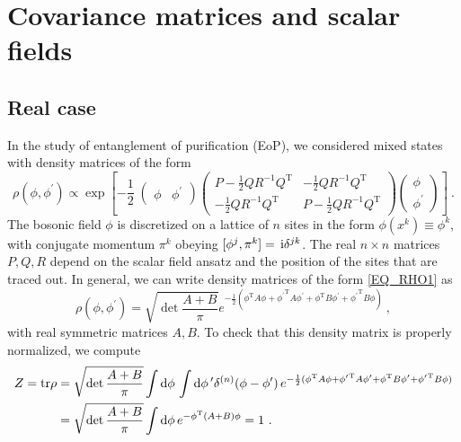 \documentclass[letter]{article}
\newcommand{\intd}[1]{\int\mathrm{d}#1\,}
\begin{document}
\section{Covariance matrices and scalar fields}
\subsection{Real case}

In the study of entanglement of purification (EoP), we considered mixed states with density matrices of the form
\begin{equation}
\label{EQ_RHO1}
\rho(\phi, \phi^\prime) \propto \exp\left[ 
-\frac{1}{2}\;
\begin{pmatrix}
\phi &
\phi^\prime
\end{pmatrix}
\begin{pmatrix}
P - \frac{1}{2}Q R^{-1} Q^\mathrm{T} & - \frac{1}{2}Q R^{-1} Q^\mathrm{T}\\
- \frac{1}{2}Q R^{-1} Q^\mathrm{T} & P - \frac{1}{2}Q R^{-1} Q^\mathrm{T}
\end{pmatrix}
\begin{pmatrix}
\phi \\
\phi^\prime
\end{pmatrix}
 \right]\ .
\end{equation}
The bosonic field $\phi$ is discretized on a lattice of $n$ sites in the form $\phi(x^k) \equiv \phi^k$, with conjugate momentum $\pi^k$ obeying $[\phi^j,\pi^k] = \,\mathrm{i}\delta^{j k}$. The real $n\times n$ matrices $P,Q,R$ depend on the scalar field ansatz and the position of the sites that are traced out.
In general, we can write density matrices of the form \eqref{EQ_RHO1} as
\begin{equation}
\label{EQ_RHO2}
\rho(\phi, \phi^\prime) = \sqrt{\det\frac{A+B}{\pi}} e^{-\frac{1}{2} (\phi^\mathrm{T} A \phi + {\phi^\prime}^\mathrm{T} A \phi^\prime + \phi^\mathrm{T} B \phi^\prime  + {\phi^\prime}^\mathrm{T} B \phi) }\ ,
\end{equation}
with real symmetric matrices $A,B$. To check that this density matrix is properly normalized, we compute
\begin{align}
Z = \tr{\rho} &=  \sqrt{\det\frac{A+B}{\pi}} \intd\phi \intd\phi^\prime  \delta^{(n)}(\phi - \phi^\prime)\, e^{ -\frac{1}{2} (\phi^\mathrm{T} A \phi + {\phi^\prime}^\mathrm{T} A \phi^\prime + \phi^\mathrm{T} B \phi^\prime + {\phi^\prime}^\mathrm{T} B \phi ) } \nonumber\\
&= \sqrt{\det\frac{A+B}{\pi}} \intd\phi e^{ -\phi^\mathrm{T} (A+B) \phi} 
= 1\ .
\end{align}
\end{document}
